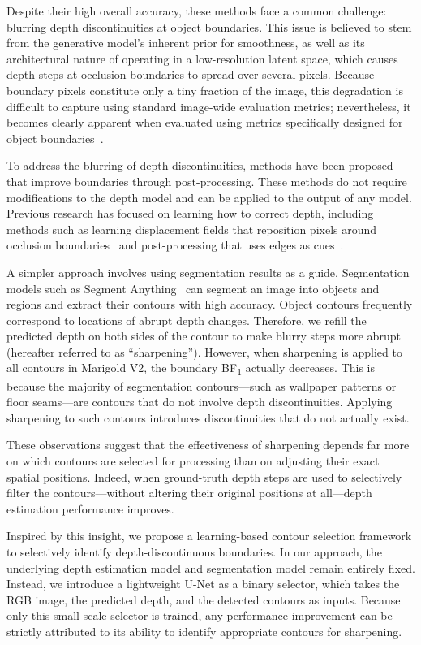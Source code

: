 \documentclass[conference]{IEEEtran}
\newcommand{\bfone}{BF\textsubscript{1}}
\begin{document}
Despite their high overall accuracy, these methods face a common challenge:
blurring depth discontinuities at object boundaries. This issue is believed to
stem from the generative model's inherent prior for smoothness, as well as its
architectural nature of operating in a low-resolution latent space, which causes
depth steps at occlusion boundaries to spread over several pixels. Because
boundary pixels constitute only a tiny fraction of the image, this degradation is
difficult to capture using standard image-wide evaluation metrics; nevertheless,
it becomes clearly apparent when evaluated using metrics specifically designed for
object boundaries~\cite{depthpro}.

To address the blurring of depth discontinuities, methods have been proposed that
improve boundaries through post-processing. These methods do not require
modifications to the depth model and can be applied to the output of any model.
Previous research has focused on learning how to correct depth, including methods
such as learning displacement fields that reposition pixels around occlusion
boundaries~\cite{ramamonjisoa} and post-processing that uses edges as
cues~\cite{edgeguided}.

A simpler approach involves using segmentation results as a guide. Segmentation
models such as Segment Anything~\cite{sam} can segment an image into objects and
regions and extract their contours with high accuracy. Object contours frequently
correspond to locations of abrupt depth changes. Therefore, we refill the
predicted depth on both sides of the contour to make blurry steps more abrupt
(hereafter referred to as ``sharpening''). However, when sharpening is applied to
all contours in Marigold V2, the boundary \bfone{} actually decreases. This is
because the majority of segmentation contours---such as wallpaper patterns or
floor seams---are contours that do not involve depth discontinuities. Applying
sharpening to such contours introduces discontinuities that do not actually exist.

These observations suggest that the effectiveness of sharpening depends far more
on which contours are selected for processing than on adjusting their exact
spatial positions. Indeed, when ground-truth depth steps are used to selectively
filter the contours---without altering their original positions at all---depth
estimation performance improves.

Inspired by this insight, we propose a learning-based contour selection framework
to selectively identify depth-discontinuous boundaries. In our approach, the
underlying depth estimation model and segmentation model remain entirely fixed.
Instead, we introduce a lightweight U-Net as a binary selector, which takes the
RGB image, the predicted depth, and the detected contours as inputs. Because only
this small-scale selector is trained, any performance improvement can be strictly
attributed to its ability to identify appropriate contours for sharpening.
\end{document}
